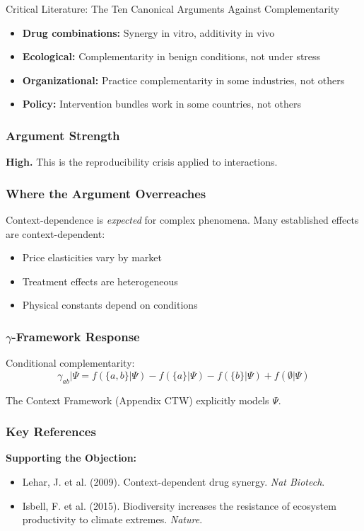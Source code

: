 \begin{chapter}{Critical Literature: The Ten Canonical Arguments Against Complementarity}
\begin{itemize}[noitemsep]
    \item \textbf{Drug combinations:} Synergy in vitro, additivity in vivo
    \item \textbf{Ecological:} Complementarity in benign conditions, not under stress
    \item \textbf{Organizational:} Practice complementarity in some industries, not others
    \item \textbf{Policy:} Intervention bundles work in some countries, not others
\end{itemize}

\subsubsection{Argument Strength}

\textbf{High.} This is the reproducibility crisis applied to interactions.

\subsubsection{Where the Argument Overreaches}

Context-dependence is \textit{expected} for complex phenomena. Many established effects are context-dependent:
\begin{itemize}[noitemsep]
    \item Price elasticities vary by market
    \item Treatment effects are heterogeneous
    \item Physical constants depend on conditions
\end{itemize}

\subsubsection{$\gamma$-Framework Response}

Conditional complementarity:
\[
\gamma_{ab}|\Psi = f(\{a,b\}|\Psi) - f(\{a\}|\Psi) - f(\{b\}|\Psi) + f(\emptyset|\Psi)
\]

The Context Framework (Appendix CTW) explicitly models $\Psi$.

\subsubsection{Key References}

\textbf{Supporting the Objection:}
\begin{itemize}[noitemsep]
    \item Lehar, J. et al. (2009). Context-dependent drug synergy. \textit{Nat Biotech}.
    \item Isbell, F. et al. (2015). Biodiversity increases the resistance of ecosystem productivity to climate extremes. \textit{Nature}.
\end{itemize}


\end{chapter}
